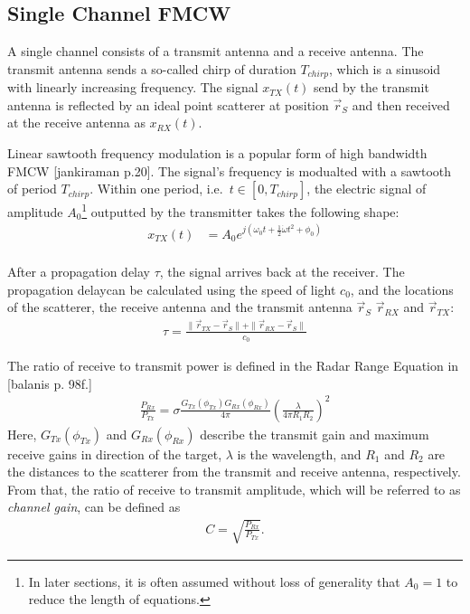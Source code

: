 \subsection{Single Channel FMCW}
A single channel consists of a transmit antenna and a receive antenna.
The transmit antenna sends a so-called chirp of duration $T_{chirp}$,
which is a sinusoid with linearly increasing frequency.
The signal $x_{TX}(t)$ send by the transmit antenna is reflected by an ideal point scatterer at position $\vec r_S$
and then received at the receive antenna as $x_{RX}(t)$.

Linear sawtooth frequency modulation is a popular form of high bandwidth FMCW [jankiraman p.20].
The signal's frequency is modualted with a sawtooth of period $T_{chirp}$.
Within one period, i.e.\ $t \in [0, T_{chirp}]$, 
the electric signal of amplitude $A_0$\footnote{
    In later sections, it is often assumed without loss of generality that $A_0=1$ to reduce the length of equations.
} outputted by the transmitter takes the following shape:
\begin{align}
    x_{TX}(t) & = A_0 e^{j(\omega_0t + \frac{1}{2}\dot \omega t^2 + \phi_0)} \label{eqn:x_TX} \\
\end{align}

After a propagation delay $\tau$, the signal arrives back at the receiver. 
The propagation delaycan be calculated using the speed of light $c_0$,
and the locations of the scatterer, the receive antenna and the transmit antenna $\vec r_S$  $\vec r_{RX}$ and $\vec r_{TX}$:
\begin{align}
    \tau = \frac{\| \vec r_{TX} - \vec r_S \|+\| \vec r_{RX} - \vec r_S \|}{c_0}
\end{align}

The ratio of receive to transmit power is defined in the Radar Range Equation in [balanis p. 98f.]
\begin{align}
    \frac{P_{Rx}}{P_{Tx}} = \sigma \frac{G_{Tx}(\phi_{Tx}) G_{Rx}(\phi_{Rx})}{4\pi} \left(\frac{\lambda}{4\pi R_1 R_2}\right)^2
\end{align}
Here, $G_{Tx}(\phi_{Tx})$ and $G_{Rx}(\phi_{Rx})$ describe the transmit gain and maximum receive gains 
in direction of the target, $\lambda$ is the wavelength, and $R_1$ and $R_2$ are the distances to the scatterer
from the transmit and receive antenna, respectively.
From that, the ratio of receive to transmit amplitude,
which will be referred to as \emph{channel gain}, can be defined as
\begin{align}
    C = \sqrt{\frac{P_{Rx}}{P_{Tx}}}.
\end{align}

